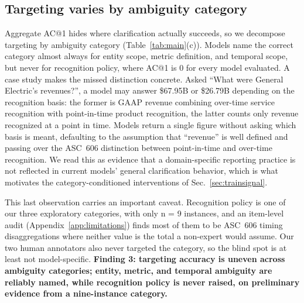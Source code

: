 \subsection{Targeting varies by ambiguity category}
\label{sec:skills}
Aggregate AC@1 hides where clarification actually succeeds, so we decompose targeting by ambiguity category (Table~\ref{tab:main}(c)). Models name the correct category almost always for entity scope, metric definition, and temporal scope, but never for recognition policy, where AC@1 is 0 for every model evaluated. A case study makes the missed distinction concrete. Asked ``What were General Electric's revenues?'', a model may answer \$67.95B or \$26.79B depending on the recognition basis: the former is GAAP revenue combining over-time service recognition with point-in-time product recognition, the latter counts only revenue recognized at a point in time. Models return a single figure without asking which basis is meant, defaulting to the assumption that ``revenue'' is well defined and passing over the ASC~606 distinction between point-in-time and over-time recognition. We read this as evidence that a domain-specific reporting practice is not reflected in current models' general clarification behavior, which is what motivates the category-conditioned interventions of Sec.~\ref{sec:trainsignal}.

This last observation carries an important caveat. Recognition policy is one of our three exploratory categories, with only n = 9 instances, and an item-level audit (Appendix~\ref{app:limitations}) finds most of them to be ASC~606 timing disaggregations where neither value is the total a non-expert would assume. Our two human annotators also never targeted the category, so the blind spot is at least not model-specific. \textbf{Finding 3: targeting accuracy is uneven across ambiguity categories; entity, metric, and temporal ambiguity are reliably named, while recognition policy is never raised, on preliminary evidence from a nine-instance category.}

